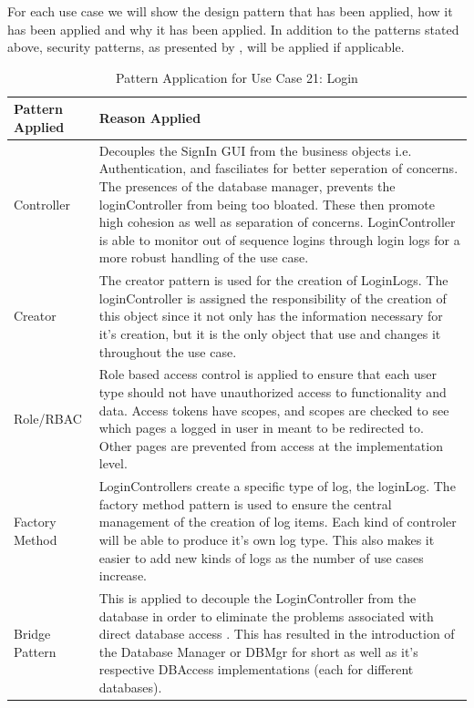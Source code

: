 \documentclass[11pt]{article}
\begin{document}
For each use case we will show the design pattern that has been applied, how it has been applied and why it has been applied. 
In addition to the patterns stated above, security patterns, as presented by \cite{Book:1}, will be applied if applicable.
\begin{table}[H]
	\centering
	\begin{tabular}{|p{5cm}|p{10cm}|}
		\hline 
		Pattern Applied & Reason Applied \\
		\hline
		Controller & Decouples the SignIn GUI from the business objects i.e. Authentication, and fasciliates for better seperation of concerns. The presences of the database manager, prevents the loginController from being too bloated. These then promote high cohesion as well as separation of concerns. LoginController is able to monitor out of sequence logins through login logs for a more robust handling of the use case.\cite{Book:1}\\
		\hline
		Creator & The creator pattern is used for the creation of LoginLogs. The loginController is assigned the responsibility of the creation of this object since it not only has the information necessary for it's creation, but it is the only object that use and changes it throughout the use case.\cite{Book:1}\\
		\hline
		Role/RBAC & Role based access control is applied to ensure that each user type should not have unauthorized access to functionality and data. Access tokens have scopes, and scopes are checked to see which pages a logged in user in meant to be redirected to. Other pages are prevented from access at the implementation level.\cite{Book:1}\\
		\hline
		Factory Method & LoginControllers create a specific type of log, the loginLog. The factory method pattern is used to ensure the central management of the creation of log items. Each kind of controler will be able to produce it's own log type. This also makes it easier to add new kinds of logs as the number of use cases increase.\\
		\hline
		Bridge Pattern & This is applied to decouple the LoginController from the database in order to eliminate the problems associated with direct database access \cite{Book:1}. This has resulted in the introduction of the Database Manager or DBMgr for short as well as it's respective DBAccess implementations (each for different databases).\\
		\hline
	\end{tabular}
	\caption{Pattern Application for Use Case 21: Login}
\end{table}
 
\end{document}
